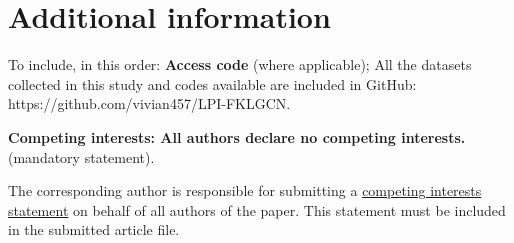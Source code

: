 \documentclass[fleqn,10pt]{wlscirep}
\begin{document}
\section*{Additional information}
To include, in this order: 
\textbf{Access code} (where applicable); 
All the datasets collected in this study and codes available are included in GitHub: https://github.com/vivian457/LPI-FKLGCN.

\textbf{Competing interests: All authors declare no competing interests.} (mandatory statement). 

The corresponding author is responsible for submitting a \href{http://www.nature.com/srep/policies/index.html#competing}{competing interests statement} on behalf of all authors of the paper. This statement must be included in the submitted article file.
\end{document}

